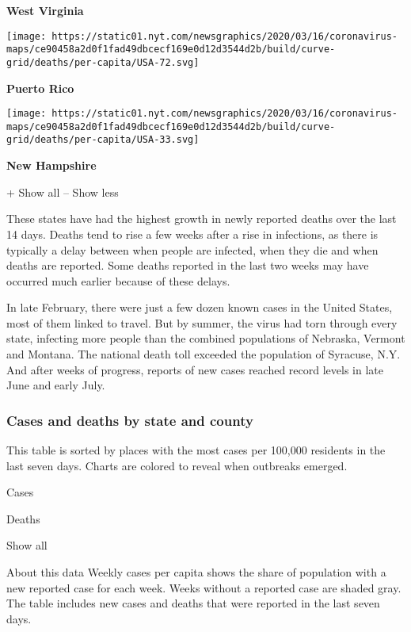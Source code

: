 \textbf{West Virginia}

\href{https://www.nytimes.com/interactive/2020/us/puerto-rico-coronavirus-cases.html}{}

\texttt{[image: https://static01.nyt.com/newsgraphics/2020/03/16/coronavirus-maps/ce90458a2d0f1fad49dbcecf169e0d12d3544d2b/build/curve-grid/deaths/per-capita/USA-72.svg]}

\textbf{Puerto Rico}

\href{https://www.nytimes.com/interactive/2020/us/new-hampshire-coronavirus-cases.html}{}

\texttt{[image: https://static01.nyt.com/newsgraphics/2020/03/16/coronavirus-maps/ce90458a2d0f1fad49dbcecf169e0d12d3544d2b/build/curve-grid/deaths/per-capita/USA-33.svg]}

\textbf{New Hampshire}

+ Show all -- Show less

These states have had the highest growth in newly reported deaths over
the last 14 days. Deaths tend to rise a few weeks after a rise in
infections, as there is typically a delay between when people are
infected, when they die and when deaths are reported. Some deaths
reported in the last two weeks may have occurred much earlier because of
these delays.

In late February, there were just a few dozen known cases in the United
States, most of them linked to travel. But by summer, the virus had torn
through every state, infecting more people than the combined populations
of Nebraska, Vermont and Montana. The national death toll exceeded the
population of Syracuse, N.Y. And after weeks of progress, reports of new
cases reached record levels in late June and early July.

\hypertarget{cases-and-deaths-by-state-and-county}{%
\subsubsection{Cases and deaths by state and
county}\label{cases-and-deaths-by-state-and-county}}

This table is sorted by places with the most cases per 100,000 residents
in the last seven days. Charts are colored to reveal when outbreaks
emerged.

Cases

Deaths

Show all

About this data Weekly cases per capita shows the share of population
with a new reported case for each week. Weeks without a reported case
are shaded gray. The table includes new cases and deaths that were
reported in the last seven days.

